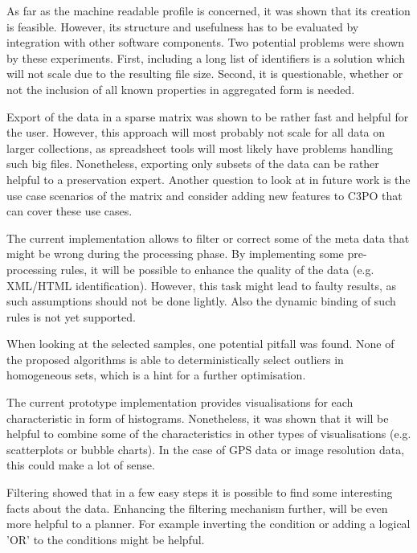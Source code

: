As far as the machine readable profile is concerned, it was shown that its creation is feasible. However, its structure and usefulness has to be evaluated by integration with other software components. Two potential problems were shown by these experiments. First, including a long list of identifiers is a solution which will not scale due to the resulting file size.
Second, it is questionable, whether or not the inclusion of all known properties in aggregated form is needed.

Export of the data in a sparse matrix was shown to be rather fast and helpful for the user. However, this approach will most probably not scale for all data on larger collections, as spreadsheet tools will most likely have problems handling such big files. Nonetheless, exporting only subsets of the data can be rather helpful to a preservation
expert. Another question to look at in future work is the use case scenarios of the matrix and consider adding new features to C3PO that can cover these use cases.

The current implementation allows to filter or correct some of the meta data that might be wrong during the processing phase. By implementing some pre-processing rules, it will be possible to enhance the quality of the data (e.g. XML/HTML identification). However, this task might lead to faulty results, as such assumptions should not be done lightly. Also the dynamic binding of such rules is not yet supported.

When looking at the selected samples, one potential pitfall was found. None of the proposed algorithms is able to deterministically select outliers in homogeneous sets, which is a hint for a further optimisation.

The current prototype implementation provides visualisations for each characteristic in form of histograms. Nonetheless, it was shown that it will be helpful to combine some of the characteristics in other types of visualisations (e.g. scatterplots or bubble charts). In the case of GPS data or image resolution data, this could make a lot of sense.

Filtering showed that in a few easy steps it is possible to find some interesting facts about the data. Enhancing the filtering mechanism further, will be even more helpful to a planner. For example inverting the condition or adding a logical 'OR' to the conditions might be helpful.